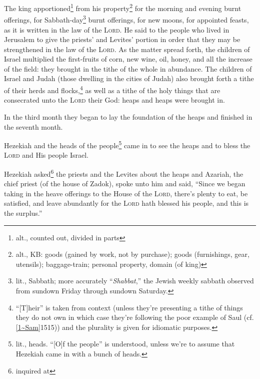 \begin{inparaenum}
     The king apportioned\footnote{alt., counted out, divided in parts} from his property\footnote{alt., KB: goods (gained by work, not by purchase); goods (furnishings, gear, utensils); baggage-train; personal property, domain (of king)} for the morning and evening burnt offerings, for Sabbath-day\footnote{lit., Sabbath; more accurately ``\textit{Shabbat},'' the Jewish weekly sabbath observed from sundown Friday through sundown Saturday.} burnt offerings, for new moons, for appointed feasts, as it is written in the law of the \textsc{Lord}.%
     He said to the people who lived in Jerusalem to give the priests' and Levites' portion in order that they may be strengthened in the law of the \textsc{Lord}.%
     As the matter spread forth, the children of Israel multiplied the first-fruits of corn, new wine, oil, honey, and all the increase of the field: they brought in the tithe of the whole in abundance.%
     The children of Israel and Judah (those dwelling in the cities of Judah) also brought forth a tithe of their herds and flocks,\footnote{``[T]heir'' is taken from context (unless they're presenting a tithe of things they do not own in which case they're following the poor example of Saul (cf. \vref{1~Sam}{15}{15})) and the plurality is given for idiomatic purposes.} as well as a tithe of the holy things that are consecrated unto the \textsc{Lord} their God: heaps and heaps were brought in.%
    
     In the third month they began to lay the foundation of the heaps and finished in the seventh month.%
    
     Hezekiah and the heads of the people\footnote{lit., heads. ``[O]f the people'' is understood, unless we're to assume that Hezekiah came in with a bunch of heads.} came in to see the heaps and to bless the \textsc{Lord} and His people Israel.%
    
     Hezekiah asked\footnote{inquired at} the priests and the Levites about the heaps%
     and Azariah, the chief priest (of the house of Zadok), spoke unto him and said, ``Since we began taking in the heave offerings to the House of the \textsc{Lord}, there's plenty to eat, be satisfied, and leave abundantly for the \textsc{Lord} hath blessed his people, and this is the surplus.''%
    

\end{inparaenum}
